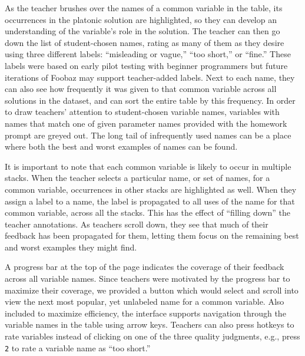 As the teacher brushes over the names of a common variable in the table, its occurrences in the platonic solution are highlighted, so they can develop an understanding of the variable's role in the solution. The teacher can then go down the list of student-chosen names, rating as many of them as they desire using three different labels: ``misleading or vague,'' ``too short,'' or ``fine.'' These labels were based on early pilot testing with beginner programmers but future iterations of Foobaz may support teacher-added labels. Next to each name, they can also see how frequently it was given to that common variable across all solutions in the dataset, and can sort the entire table by this frequency. In order to draw teachers' attention to student-chosen variable names, variables with names that match one of given parameter names provided with the homework prompt are greyed out. The long tail of infrequently used names can be a place where both the best and worst examples of names can be found.

It is important to note that each common variable is likely to occur in multiple stacks. When the teacher selects a particular name, or set of names, for a common variable, occurrences in other stacks are highlighted as well. When they assign a label to a name, the label is propagated to all uses of the name for that common variable, across all the stacks. This has the effect of ``filling down'' the teacher annotations. As teachers scroll down, they see that much of their feedback has been propagated for them, letting them focus on the remaining best and worst examples they might find. 

A progress bar at the top of the page indicates the coverage of their feedback across all variable names. Since teachers were motivated by the progress bar to maximize their coverage, we provided a button which would select and scroll into view the next most popular, yet unlabeled name for a common variable. Also included to maximize efficiency, the interface supports navigation through the variable names in the table using arrow keys. Teachers can also press hotkeys to rate variables instead of clicking on one of the three quality judgments, e.g., press \texttt{2} to rate a variable name as ``too short.''

